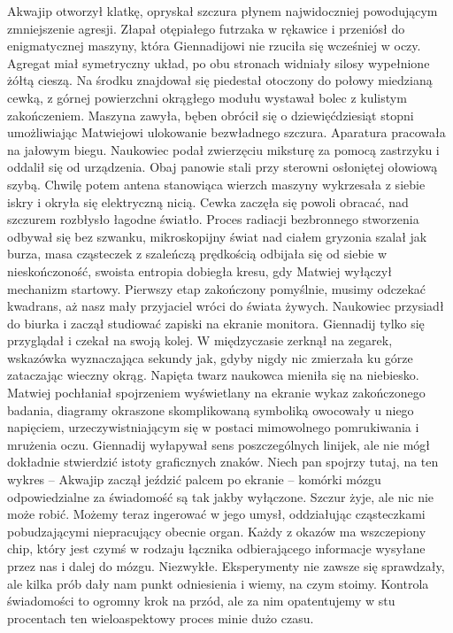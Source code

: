 \documentclass[../MAIN.tex]{subfiles}
\begin{document}
Akwajip otworzył klatkę, opryskał szczura płynem najwidoczniej powodującym zmniejszenie agresji. Złapał otępiałego futrzaka w rękawice i przeniósł do enigmatycznej maszyny, która Giennadijowi nie rzuciła się wcześniej w oczy. Agregat miał symetryczny układ, po obu stronach widniały silosy wypełnione żółtą cieszą. Na środku znajdował się piedestał otoczony do połowy miedzianą cewką, z górnej powierzchni okrągłego modułu wystawał bolec z kulistym zakończeniem. Maszyna zawyła, bęben obrócił się o dziewięćdziesiąt stopni umożliwiając Matwiejowi ulokowanie bezwładnego szczura. Aparatura pracowała na jałowym biegu. Naukowiec podał zwierzęciu miksturę za pomocą zastrzyku i oddalił się od urządzenia. Obaj panowie stali przy sterowni osłoniętej ołowiową szybą. Chwilę potem antena stanowiąca wierzch maszyny wykrzesała z siebie iskry i okryła się elektryczną nicią. Cewka zaczęła się powoli obracać, nad szczurem rozbłysło łagodne światło. Proces radiacji bezbronnego stworzenia odbywał się bez szwanku, mikroskopijny 
świat nad ciałem gryzonia szalał jak burza, masa cząsteczek z szaleńczą prędkością odbijała się od siebie w nieskończoność, swoista entropia dobiegła kresu, gdy Matwiej wyłączył mechanizm startowy. 
% 
\sx Pierwszy etap zakończony pomyślnie, musimy odczekać kwadrans, aż nasz mały przyjaciel wróci do świata żywych.
\qd
Naukowiec przysiadł do biurka i zaczął studiować zapiski na ekranie monitora. Giennadij tylko się przyglądał i czekał na swoją kolej. W międzyczasie zerknął na zegarek, wskazówka wyznaczająca sekundy jak, gdyby nigdy nic zmierzała ku górze zataczając wieczny okrąg.
%
\clearpage
{}
% 
Napięta twarz naukowca mieniła się na niebiesko. Matwiej pochłaniał spojrzeniem wyświetlany na ekranie wykaz zakończonego badania, diagramy okraszone skomplikowaną symboliką owocowały u niego napięciem, urzeczywistniającym się w postaci mimowolnego pomrukiwania i mrużenia oczu. Giennadij wyłapywał sens poszczególnych linijek, ale nie mógł dokładnie stwierdzić istoty graficznych znaków. 
% 
\sx Niech pan spojrzy tutaj, na ten wykres -- Akwajip zaczął jeździć palcem po ekranie -- komórki mózgu odpowiedzialne za świadomość są tak jakby wyłączone. Szczur żyje, ale nic nie może robić. Możemy teraz ingerować w jego umysł, oddziałując cząsteczkami pobudzającymi niepracujący obecnie organ. Każdy z okazów ma wszczepiony chip, który jest czymś w rodzaju łącznika odbierającego informacje wysyłane przez nas i dalej do mózgu. Niezwykłe. Eksperymenty nie zawsze się sprawdzały, ale kilka prób dały nam punkt odniesienia i wiemy, na czym stoimy. Kontrola świadomości to ogromny krok na przód, ale za nim opatentujemy w stu procentach ten wieloaspektowy proces minie dużo czasu. 
\end{document}
